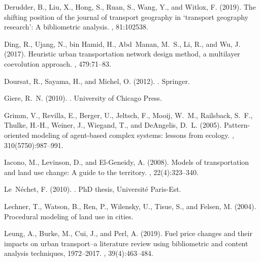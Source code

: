 \documentclass[10pt]{article}
\begin{document}
\begin{thebibliography}{}
Derudder, B., Liu, X., Hong, S., Ruan, S., Wang, Y., and Witlox, F. (2019).
\newblock The shifting position of the journal of transport geography in
  ‘transport geography research’: A bibliometric analysis.
, 81:102538.

Ding, R., Ujang, N., bin Hamid, H., Abd~Manan, M.~S., Li, R., and Wu, J.
  (2017).
\newblock Heuristic urban transportation network design method, a multilayer
  coevolution approach.
,
  479:71--83.

Doursat, R., Sayama, H., and Michel, O. (2012).
.
\newblock Springer.

Giere, R.~N. (2010).
.
\newblock University of Chicago Press.

Grimm, V., Revilla, E., Berger, U., Jeltsch, F., Mooij, W.~M., Railsback,
  S.~F., Thulke, H.-H., Weiner, J., Wiegand, T., and DeAngelis, D.~L. (2005).
\newblock Pattern-oriented modeling of agent-based complex systems: lessons
  from ecology.
, 310(5750):987--991.

Iacono, M., Levinson, D., and El-Geneidy, A. (2008).
\newblock Models of transportation and land use change: A guide to the
  territory.
, 22(4):323--340.

Le~N{\'e}chet, F. (2010).
.
\newblock PhD thesis, Universit{\'e} Paris-Est.

Lechner, T., Watson, B., Ren, P., Wilensky, U., Tisue, S., and Felsen, M.
  (2004).
\newblock Procedural modeling of land use in cities.

Leung, A., Burke, M., Cui, J., and Perl, A. (2019).
\newblock Fuel price changes and their impacts on urban transport--a literature
  review using bibliometric and content analysis techniques, 1972--2017.
, 39(4):463--484.


\end{thebibliography}
\end{document}
